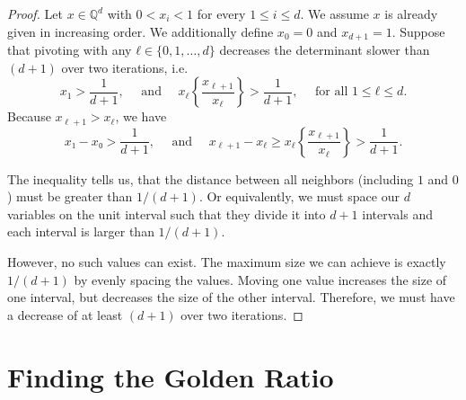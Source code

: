 \begin{proof}
  Let $x ∈ ℚ^d$ with $0 < x_i < 1$ for every $1 ≤ i ≤ d$.
  We assume $x$ is already given in increasing order.
  We additionally define $x_0 = 0$ and $x_{d+1} = 1$.
  Suppose that pivoting with any $ℓ ∈ \{0, 1, \dots, d\}$
  decreases the determinant slower than $(d+1)$ over two iterations,
  i.e.
  \[
    x_1 > \frac{1}{d+1},
    \quad \text{ and } \quad
    x_\ell \left\{\frac{x_{\ell+1}}{x_\ell}\right\} > \frac{1}{d+1}, \quad \text{ for all } 1 ≤ ℓ ≤ d.
  \]
  Because $x_{\ell+1} > x_\ell$, we have
  \[
    x₁ - x₀ > \frac{1}{d+1},
    \quad \text{ and } \quad
    x_{\ell+1} - x_\ell ≥ x_\ell \left\{\frac{x_{\ell+1}}{x_\ell}\right\} > \frac{1}{d+1}.
  \]

  The inequality tells us, that the distance between all neighbors
  (including $1$ and $0$) must be greater than $1/(d+1)$.
  Or equivalently, we must space our $d$ variables on the unit interval such that they
  divide it into $d+1$ intervals and each interval is larger than $1/(d+1)$.

  {\begin{center}
  \end{center}}

  However, no such values can exist.
  The maximum size we can achieve is exactly $1/(d+1)$ by evenly
  spacing the values.
  Moving one value increases the size of one interval, but decreases the size
  of the other interval.
  Therefore, we must have a decrease of at least $(d+1)$ over two iterations.
\end{proof}

\section{Finding the Golden Ratio}

